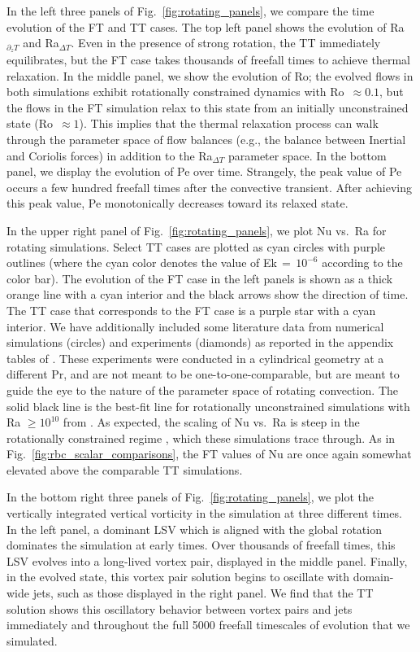 In the left three panels of Fig.~\ref{fig:rotating_panels}, we compare the time evolution of the FT and TT cases.
The top left panel shows the evolution of Ra$_{\partial_z T}$ and Ra$_{\Delta T}$.
Even in the presence of strong rotation, the TT immediately equilibrates, but the FT case takes thousands of freefall times to achieve thermal relaxation.
In the middle panel, we show the evolution of Ro; the evolved flows in both simulations exhibit rotationally constrained dynamics with Ro $\,\approx 0.1$, but the flows in the FT simulation relax to this state from an initially unconstrained state (Ro $\,\approx 1$).
This implies that the thermal relaxation process can walk through the parameter space of flow balances (e.g., the balance between Inertial and Coriolis forces) in addition to the Ra$_{\Delta T}$ parameter space.
In the bottom panel, we display the evolution of Pe over time.
Strangely, the peak value of Pe occurs a few hundred freefall times after the convective transient.
After achieving this peak value, Pe monotonically decreases toward its relaxed state.



In the upper right panel of Fig.~\ref{fig:rotating_panels}, we plot Nu vs.~Ra for rotating simulations.
Select TT cases are plotted as cyan circles with purple outlines (where the cyan color denotes the value of Ek$\,=\,10^{-6}$ according to the color bar).
The evolution of the FT case in the left panels is shown as a thick orange line with a cyan interior and the black arrows show the direction of time.
The TT case that corresponds to the FT case is a purple star with a cyan interior.
We have additionally included some literature data from numerical simulations (circles) and experiments (diamonds) as reported in the appendix tables of \citet{cheng&all2015}.
These experiments were conducted in a cylindrical geometry at a different Pr, and are not meant to be one-to-one-comparable, but are meant to guide the eye to the nature of the parameter space of rotating convection.
The solid black line is the best-fit line for rotationally unconstrained simulations with Ra $\geq 10^{10}$ from \citet{cheng&all2015}.
As expected, the scaling of Nu vs.~Ra is steep in the rotationally constrained regime \citep{julien&all2012, plumley&julien2019}, which these simulations trace through.
As in Fig.~\ref{fig:rbc_scalar_comparisons}, the FT values of Nu are once again somewhat elevated above the comparable TT simulations.

In the bottom right three panels of Fig.~\ref{fig:rotating_panels}, we plot the vertically integrated vertical vorticity in the simulation at three different times.
In the left panel, a dominant LSV which is aligned with the global rotation dominates the simulation at early times.
Over thousands of freefall times, this LSV evolves into a long-lived vortex pair, displayed in the middle panel.
Finally, in the evolved state, this vortex pair solution begins to oscillate with domain-wide jets, such as those displayed in the right panel.
We find that the TT solution shows this oscillatory behavior between vortex pairs and jets immediately and throughout the full 5000 freefall timescales of evolution that we simulated.

